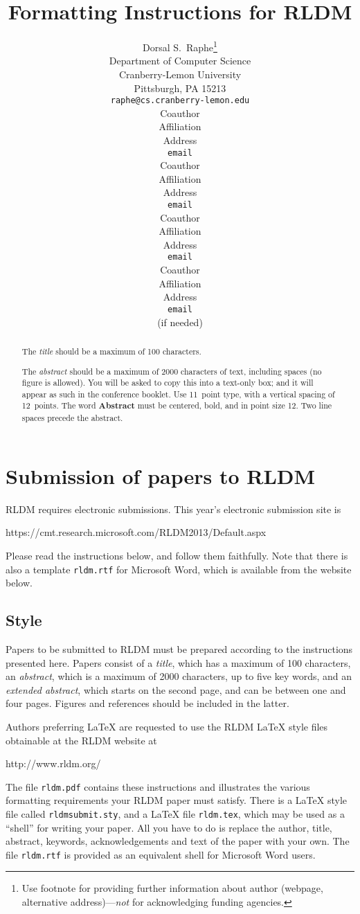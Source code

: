 \documentclass[11pt]{article} %
\title{Formatting Instructions for RLDM}
\author{
Dorsal S.~Raphe\thanks{ Use footnote for providing further information
about author (webpage, alternative address)---\emph{not} for acknowledging
funding agencies.} \\
Department of Computer Science\\
Cranberry-Lemon University\\
Pittsburgh, PA 15213 \\
\texttt{raphe@cs.cranberry-lemon.edu} \\
\And
Coauthor \\
Affiliation \\
Address \\
\texttt{email} \\
\AND
Coauthor \\
Affiliation \\
Address \\
\texttt{email} \\
\And
Coauthor \\
Affiliation \\
Address \\
\texttt{email} \\
\And
Coauthor \\
Affiliation \\
Address \\
\texttt{email} \\
(if needed)\\
}
\begin{document}
\maketitle

\begin{abstract}
The \emph{title} should be a maximum of 100 characters. 

The \emph{abstract} should be a maximum of 2000 characters of text,
including spaces (no figure is allowed). You will be asked to copy
this into a text-only box; and it will appear as such in the
conference booklet. Use 11~point type, with a vertical spacing of
12~points.  The word \textbf{Abstract} must be centered, bold, and in
point size 12. Two line spaces precede the abstract.
\end{abstract}




\startmain %

\section{Submission of papers to RLDM}

RLDM requires electronic submissions.  This year's electronic
submission site is   
\begin{center}
   https://cmt.research.microsoft.com/RLDM2013/Default.aspx
\end{center}

Please read the instructions below, and follow them faithfully. Note
that there is also a template \verb+rldm.rtf+ for Microsoft Word,
which is available from the website below.
\subsection{Style}

Papers to be submitted to RLDM must be prepared according to the
instructions presented here. Papers consist of a \emph{title}, which
has a maximum of 100 characters, an \emph{abstract}, which is a
maximum of 2000 characters, up to five key words, and an
\emph{extended abstract}, which starts on the second page, and can be
between one and four pages. Figures and references should be included
in the latter.

Authors preferring \LaTeX{} are requested to use the RLDM \LaTeX{}
style files obtainable at the RLDM website at
\begin{center}
   http://www.rldm.org/
\end{center}
The file \verb+rldm.pdf+ contains these instructions and illustrates
the various formatting requirements your RLDM paper must
satisfy. There is a \LaTeX{} style file called \verb+rldmsubmit.sty+,
and a \LaTeX{} file \verb+rldm.tex+, which may be used as a ``shell''
for writing your paper. All you have to do is replace the author,
title, abstract, keywords, acknowledgements and text of the paper with
your own. The file
\verb+rldm.rtf+ is provided as an equivalent shell for Microsoft Word users. 
\end{document}
